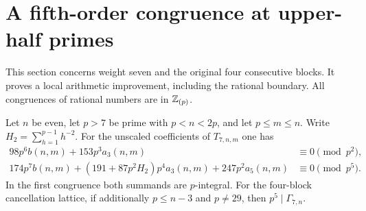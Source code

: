 \section{A fifth-order congruence at upper-half primes}
\label{sec:upper-half-fifth-order}

This section concerns weight seven and the original four consecutive blocks.
It proves a local arithmetic improvement, including the rational boundary.
All congruences of rational numbers are in $\mathbb Z_{(p)}$.

\begin{theorem}\label{thm:upper-half-row}
Let $n$ be even, let $p>7$ be prime with $p<n<2p$, and let
$p\le m\le n$. Write $H_2=\sum_{h=1}^{p-1}h^{-2}$.
For the unscaled coefficients of $T_{7,n,m}$ one has
\begin{align}
 98p^6b(n,m)+153p^3a_3(n,m)&\equiv0\pmod{p^2},\label{eq:upper-half-second}\\
 174p^7b(n,m)+(191+87p^2H_2)p^4a_3(n,m)
       +247p^2a_5(n,m)&\equiv0\pmod{p^5}.\label{eq:upper-half-fifth}
\end{align}
In the first congruence both summands are $p$-integral.
For the four-block cancellation lattice, if additionally $p\le n-3$
and $p\ne29$, then $p^5\mid\Gamma_{7,n}$.
\end{theorem}

